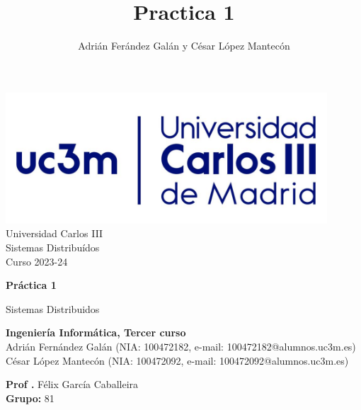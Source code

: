 \documentclass[]{article}
\title{Practica 1}
\author{Adrián Ferández Galán y César López Mantecón}
\begin{document}
\begin{titlepage}
    \centering
   \includegraphics[width=0.9\textwidth]{uc3m.jpg} 
    {\Huge Universidad Carlos III\\
    
     \Large Sistemas Distribuídos\\
     \vspace{0.5cm}
     Curso 2023-24}
    \vspace{2cm}

    {\Huge \textbf{Práctica 1} \par}
    \vspace{0.5cm}
    {\Large Sistemas Distribuidos \par}
    \vspace{8cm}

   \textbf{Ingeniería Informática, Tercer curso}\\
    \vspace{0.2cm} 
    Adrián Fernández Galán (NIA: 100472182, e-mail: 100472182@alumnos.uc3m.es) \\
    César López Mantecón   (NIA: 100472092, e-mail: 100472092@alumnos.uc3m.es)
    \vspace{0.5cm}

   
    \textbf{Prof .} Félix García Caballeira\\
    \textbf{Grupo: } 81   
    
\end{titlepage}
 
\end{document}

